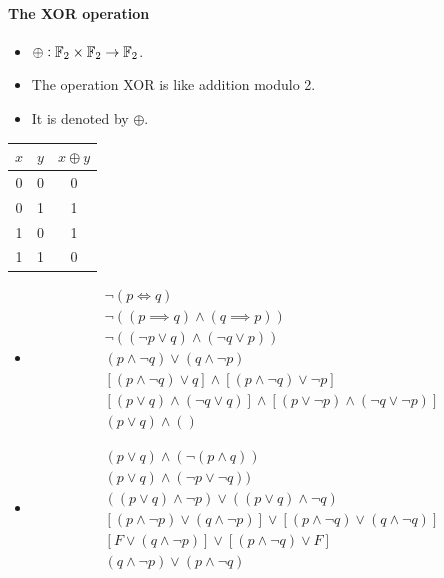 \documentclass[11pt,openany]{article}
\begin{document}
\paragraph{The XOR operation}
\begin{itemize}
	\item $\oplus:\mathbb{F}_2\times\mathbb{F}_2\to\mathbb{F}_2$.
	\item The operation XOR is like addition modulo 2.
	\item It is denoted by $\oplus$.
\end{itemize}
\begin{center}
	\begin{tabular}{c|c||c}
		\toprule[1.2pt]
		$x$ & $y$ & $x\oplus y$\\
		\hline
		0 & 0 & 0\\
		\hline
		0 & 1 & 1\\
		\hline
		1 & 0 & 1\\
		\hline
		1 & 1 & 0\\
		\bottomrule[1.2pt]
	\end{tabular}
\end{center}

\begin{itemize}
	\item 
	\begin{align*}
		\lnot (p\iff q) \\
		\lnot ((p\implies q) \land (q\implies p))\\
		\lnot ((\lnot p \lor q) \land (\lnot q\lor p))\\
		(p\land \lnot q)\lor(q\land\lnot p) \\
		[(p\land\lnot q)\lor q]\land[(p\land\lnot q)\lor\lnot p] \\ 
		[(p\lor q)\land(\lnot q\lor q)]\land[(p\lor\lnot p)\land(\lnot q\lor\lnot p)] \\
		(p\lor q)\land ()
	\end{align*}
	\item \begin{align*}
		(p\lor q)\land(\lnot(p\land q))\\
		(p\lor q)\land(\lnot p\lor\lnot q))\\
		((p\lor q)\land\lnot p)\lor	((p\lor q)\land\lnot q)	\\
		[(p\land\lnot p)\lor(q\land\lnot p)]\lor [(p\land\lnot q)\lor(q\land\lnot q)] \\
		[F\lor(q\land\lnot p)]\lor [(p\land\lnot q)\lor F] \\
		(q\land\lnot p)\lor (p\land\lnot q)
	\end{align*}
\end{itemize}
\end{document}
